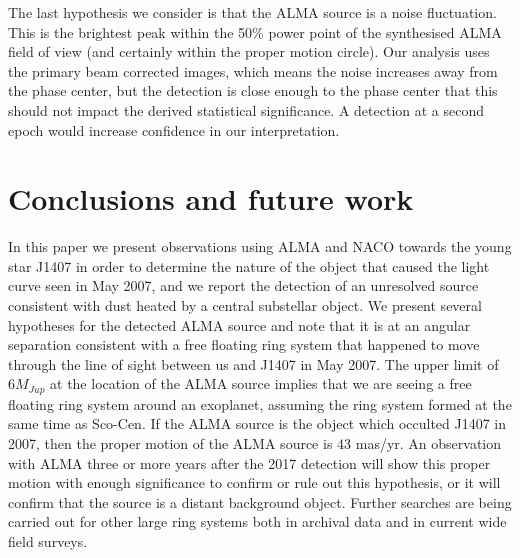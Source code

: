 \documentclass[twocolumn]{aa} %
\begin{document}
The last hypothesis we consider is that the ALMA source is a noise fluctuation.
%
This is the brightest peak within the 50\% power point of the synthesised ALMA field of view (and certainly within the proper motion circle).
%
Our analysis uses the primary beam corrected images, which means the noise increases away from the phase center, but the detection is close enough to the phase center that this should not impact the derived statistical significance.
%
A detection at a second epoch would increase confidence in our interpretation.

\section{Conclusions and future work}\label{concl} %

In this paper we present observations using ALMA and NACO towards the young star J1407 in order to determine the nature of the object that caused the light curve seen in May 2007, and we report the detection of an unresolved source consistent with dust heated by a central substellar object.
%
We present several hypotheses for the detected ALMA source and note that it is at an angular separation consistent with a free floating ring system that happened to move through the line of sight between us and J1407 in May 2007.
%
The upper limit of $6M_{Jup}$ at the location of the ALMA source implies that we are seeing a free floating ring system around an exoplanet, assuming the ring system formed at the same time as Sco-Cen.
%
If the ALMA source is the object which occulted J1407 in 2007, then the proper motion of the ALMA source is $43$ mas/yr. 
%
An observation with ALMA three or more years after the 2017 detection will show this proper motion with enough significance to confirm or rule out this hypothesis, or it will confirm that the source is a distant background object.
%
Further searches are being carried out for other large ring systems both in archival data and in current wide field surveys.
\end{document}
